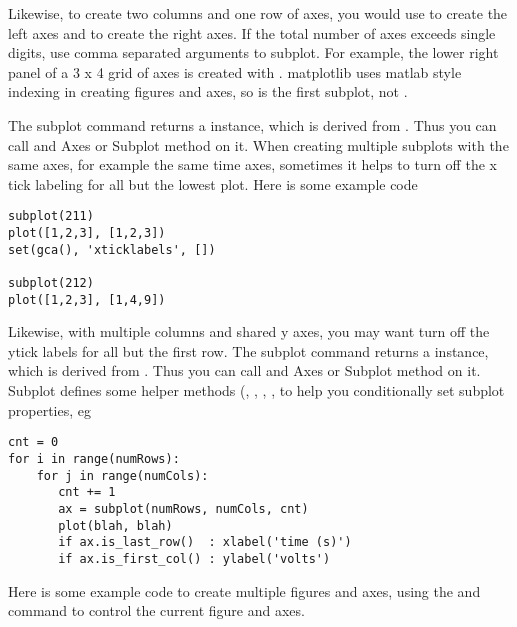 \documentclass[]{book}
\begin{document}




\noindent Likewise, to create two columns and one row of axes, you would use
 to create the left axes and  to
create the right axes.  If the total number of axes exceeds single
digits, use comma separated arguments to subplot.  For example, the
lower right panel of a 3 x 4 grid of axes is created with
.  matplotlib uses matlab style indexing in
creating figures and axes, so  is the first
subplot, not .


The subplot command returns a 
instance, which is derived from .  Thus
you can call and Axes or Subplot method on it.  When creating multiple
subplots with the same axes, for example the same time axes, sometimes
it helps to turn off the x tick labeling for all but the lowest plot.
Here is some example code

\begin{lstlisting}
subplot(211)
plot([1,2,3], [1,2,3])
set(gca(), 'xticklabels', [])

subplot(212)
plot([1,2,3], [1,4,9])
\end{lstlisting}


Likewise, with multiple columns and shared y axes, you may want turn
off the ytick labels for all but the first row.  The subplot command
returns a  instance, which is derived
from .  Thus you can call and Axes or
Subplot method on it.  Subplot defines some helper methods
(, , ,
, to help you conditionally set subplot properties,
eg

\begin{lstlisting}
cnt = 0
for i in range(numRows):
    for j in range(numCols):
       cnt += 1
       ax = subplot(numRows, numCols, cnt)
       plot(blah, blah)
       if ax.is_last_row()  : xlabel('time (s)')
       if ax.is_first_col() : ylabel('volts')
\end{lstlisting}


Here is some example code to create multiple figures and axes, using
the  and  command to control the current
figure and axes.
\end{document}
